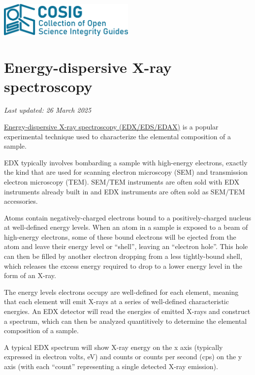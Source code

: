 \documentclass[letterpaper, 12pt]{article}
\begin{document}
\flushleft
\includegraphics[width=0.5\textwidth]{img/home/241017_final_logo_mockup.png}

\section*{Energy-dispersive X-ray spectroscopy}
\textit{Last updated: 26 March 2025}

\href{https://en.wikipedia.org/wiki/Energy-dispersive_X-ray_spectroscopy}{Energy-dispersive X-ray spectroscopy (EDX/EDS/EDAX)} is a popular experimental technique used to characterize the elemental composition of a sample.

EDX typically involves bombarding a sample with high-energy electrons, exactly the kind that are used for scanning electron microscopy (SEM) and transmission electron microscopy (TEM). SEM/TEM instruments are often sold with EDX instruments already built in and EDX instruments are often sold as SEM/TEM accessories.

Atoms contain negatively-charged electrons bound to a positively-charged nucleus at well-defined energy levels. When an atom in a sample is exposed to a beam of high-energy electrons, some of these bound electrons will be ejected from the atom and leave their energy level or ``shell'', leaving an ``electron hole''. This hole can then be filled by another electron dropping from a less tightly-bound shell, which releases the excess energy required to drop to a lower energy level in the form of an X-ray.

The energy levels electrons occupy are well-defined for each element, meaning that each element will emit X-rays at a series of well-defined characteristic energies. An EDX detector will read the energies of emitted X-rays and construct a spectrum, which can then be analyzed quantitively to determine the elemental composition of a sample.

A typical EDX spectrum will show X-ray energy on the x axis (typically expressed in electron volts, eV) and counts or counts per second (cps) on the y axis (with each ``count'' representing a single detected X-ray emission).
\end{document}
